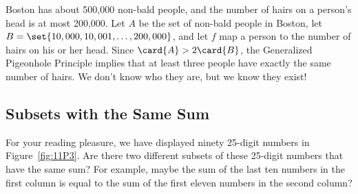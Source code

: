 Boston has about 500,000 non-bald people, and the number of hairs on a
person's head is at most 200,000.  Let $A$ be the set of non-bald people
in Boston, let $B = \set{10,000, 10,001, \dots, 200,000}$, and let $f$ map
a person to the number of hairs on his or her head.  Since $\card{A} > 2
\card{B}$, the Generalized Pigeonhole Principle implies that at least
three people have exactly the same number of hairs.  We don't know who
they are, but we know they exist!

\subsection{Subsets with the Same Sum}

For your reading pleasure, we have displayed ninety 25-digit numbers
in Figure~\ref{fig:11P3}.  Are there two different subsets of these
25-digit numbers that have the same sum? For example, maybe the sum of
the last ten numbers in the first column is equal to the sum of the
first eleven numbers in the second column?

